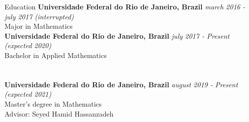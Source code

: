 \documentclass{resume} %
\begin{document}

\begin{rSection}{Education}
{\bf Universidade Federal do Rio de Janeiro, Brazil} \hfill {\em march 2016 - july 2017 (interrupted)} 
\\ Major in Mathematics\\
{\bf Universidade Federal do Rio de Janeiro, Brazil} \hfill {\em july 2017 - Present (expected 2020)} 
\\ Bachelor in Applied Mathematics
\\ 
\\
\\{\bf Universidade Federal do Rio de Janeiro, Brazil} \hfill {\em august 2019 - Present (expected 2021)} 
\\ Master's degree in Mathematics
\\ Advisor: Seyed Hamid Hassanzadeh

\end{rSection}

\end{document}
